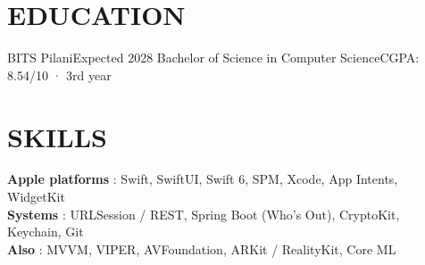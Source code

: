 \section{EDUCATION}
  \resumeSubHeadingListStart
    \resumeSubheading
      {BITS Pilani}{Expected 2028}
      {Bachelor of Science in Computer Science}{CGPA: 8.54/10 · 3rd year}
  \resumeSubHeadingListEnd

\section{SKILLS}
 \begin{itemize}[leftmargin=0in, label={}]
    \small{\item{
     \textbf{Apple platforms} {: Swift, SwiftUI, Swift 6, SPM, Xcode, App Intents, WidgetKit} \vspace{1pt} \\
     \textbf{Systems} {: URLSession / REST, Spring Boot (Who's Out), CryptoKit, Keychain, Git} \vspace{1pt} \\
     \textbf{Also} {: MVVM, VIPER, AVFoundation, ARKit / RealityKit, Core ML}
    }}
 \end{itemize}


